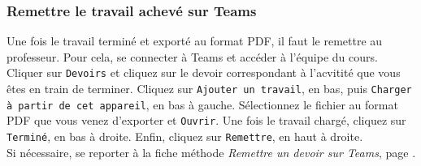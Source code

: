 \subsubsection{Remettre le travail achevé sur Teams}

Une fois le travail terminé et exporté au format PDF, il faut le remettre au professeur. Pour cela, se connecter à Teams et accéder à l'équipe du cours. Cliquer sur \texttt{Devoirs} et cliquez sur le devoir correspondant à l'acvitité que vous êtes en train de terminer. Cliquez sur \texttt{Ajouter un travail}, en bas, puis \texttt{Charger à partir de cet appareil}, en bas à gauche. Sélectionnez le fichier au format PDF que vous venez d'exporter et \texttt{Ouvrir}. Une fois le travail chargé, cliquez sur \texttt{Terminé}, en bas à droite. Enfin, cliquez sur \texttt{Remettre}, en haut à droite.\\



Si nécessaire, se reporter à la fiche méthode \emph{Remettre un devoir sur Teams}, page \pageref{TeamsRemettreDevoir}.



